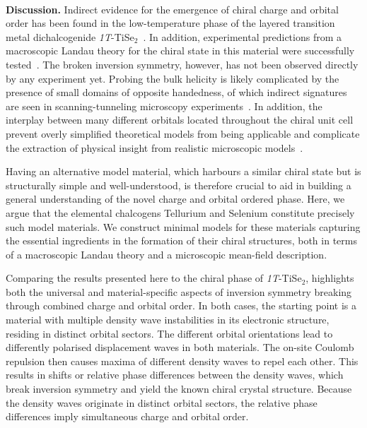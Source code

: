 \documentclass[aps,prl,twocolumn,superscriptaddress,groupedaddress]{revtex4}
\begin{document}
~\\
{\bf Discussion.} Indirect evidence for the emergence of chiral charge and orbital order has been found in the low-temperature phase of the layered transition metal dichalcogenide \emph{1T}-TiSe$_2$~\cite{ishioka,vanwezel,castellan}. In addition, experimental predictions from a macroscopic Landau theory for the chiral state in this material were successfully tested~\cite{castellan}. The broken inversion symmetry, however, has not been observed directly by any experiment yet. Probing the bulk helicity is likely complicated by the presence of small domains of opposite handedness, of which indirect signatures are seen in scanning-tunneling microscopy experiments~\cite{iavarone}. In addition, the interplay between many different orbitals located throughout the chiral unit cell prevent overly simplified theoretical models from being applicable and complicate the extraction of physical insight from realistic microscopic models~\cite{monney,zhu_tbp}.

Having an alternative model material, which harbours a similar chiral state but is structurally simple and well-understood, is therefore crucial to aid in building a general understanding of the novel charge and orbital ordered phase. Here, we argue that the elemental chalcogens Tellurium and Selenium constitute precisely such model materials. We construct minimal models for these materials capturing the essential ingredients in the formation of their chiral structures, both in terms of a macroscopic Landau theory and a microscopic mean-field description. 

Comparing the results presented here to the chiral phase of \emph{1T}-TiSe$_2$, highlights both the universal and material-specific aspects of inversion symmetry breaking through combined charge and orbital order. In both cases, the starting point is a material with multiple density wave instabilities in its electronic structure, residing in distinct orbital sectors. The different orbital orientations lead to differently polarised displacement waves in both materials. The on-site Coulomb repulsion then causes maxima of different density waves to repel each other. This results in shifts or relative phase differences between the density waves, which break inversion symmetry and yield the known chiral crystal structure. Because the density waves originate in distinct orbital sectors, the relative phase differences imply simultaneous charge and orbital order. 
\end{document}
